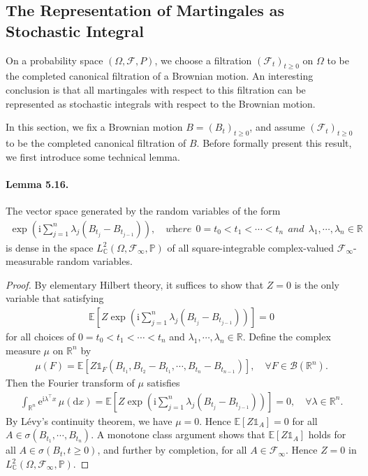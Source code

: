\documentclass{article}
\numberwithin{equation}{section}
\newcommand{\e}{\mathrm{e}}
\newcommand{\E}{\mathbb{E}}
\renewcommand{\P}{\mathbb{P}}
\renewcommand{\d}{\mathrm{d}}
\renewcommand{\i}{\mathrm{i}}
\theoremstyle{plain}
\theoremstyle{definition}
\begin{document}
\newpage
\subsection{The Representation of Martingales as Stochastic	Integral}
On a probability space $(\Omega,\mathscr{F},P)$, we choose a filtration $(\mathscr{F}_t)_{t\geq 0}$ on $\Omega$ to be the completed canonical filtration of a Brownian motion. An interesting conclusion is that all martingales with respect to this filtration can be represented as stochastic integrals with respect to the Brownian motion. 

In this section, we fix a Brownian motion $B=(B_t)_{t\geq 0}$, and assume $(\mathscr{F}_t)_{t\geq 0}$ to be the completed canonical filtration of $B$. Before formally present this result, we first introduce some technical lemma.

\paragraph{Lemma 5.16.\label{lemma:5.16}} The vector space generated by the random variables of the form
\begin{align*}
	\exp\left(\i\sum_{j=1}^n\lambda_j(B_{t_j}-B_{t_{j-1}})\right),\quad \textit{where}\ \ 0=t_0<t_1<\cdots<t_n\ \ \textit{and}\ \ \lambda_1,\cdots,\lambda_n\in\mathbb{R}
\end{align*}
is dense in the space $L^2_\mathbb{C}(\Omega,\mathscr{F}_\infty,\P)$ of all square-integrable complex-valued $\mathscr{F}_\infty$-measurable random variables.
\begin{proof}
By elementary Hilbert theory, it suffices to show that $Z=0$ is the only variable that satisfying
\begin{align*}
	\E\left[Z\exp\left(\i\sum_{j=1}^n\lambda_j(B_{t_j}-B_{t_{j-1}})\right)\right]=0
\end{align*}
for all choices of $0=t_0<t_1<\cdots<t_n$ and $\lambda_1,\cdots,\lambda_n\in\mathbb{R}$. Define the complex measure $\mu$ on $\mathbb{R}^n$ by
\begin{align*}
	\mu(F)=\E\left[Z\mathds{1}_F(B_{t_1},B_{t_2}-B_{t_1},\cdots,B_{t_n}-B_{t_{n-1}})\right],\quad\forall F\in\mathscr{B}(\mathbb{R}^n).
\end{align*}
Then the Fourier transform of $\mu$ satisfies
\begin{align*}
	\int_{\mathbb{R}^n}\e^{\i\lambda^\top x}\,\mu(\d x) =	\E\left[Z\exp\left(\i\sum_{j=1}^n\lambda_j(B_{t_j}-B_{t_{j-1}})\right)\right]=0,\quad\forall\lambda\in\mathbb{R}^n.
\end{align*}
By Lévy's continuity theorem, we have $\mu=0$. Hence $\E[Z\mathds{1}_A]=0$ for all $A\in\sigma(B_{t_1},\cdots,B_{t_n})$. A monotone class argument shows that $\E[Z\mathds{1}_A]$ holds for all $A\in\sigma(B_t,t\geq 0)$, and further by completion, for all $A\in\mathscr{F}_\infty$. Hence $Z=0$ in $L^2_\mathbb{C}(\Omega,\mathscr{F}_\infty,\P)$.
\end{proof}
\end{document}
